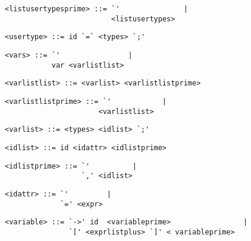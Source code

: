 \begin{footnotesize}
\begin{lstlisting}[frame=single, label={listusertypesprime}]
<listusertypesprime> ::= `'               |
                         <listusertypes>
\end{lstlisting}

\begin{lstlisting}[frame=single, label={usertypes}]
<usertype> ::= id `=` <types> `;'
\end{lstlisting}

\begin{lstlisting}[frame=single, label={vars}, language=pie]
<vars> ::= `'                |
           var <varlistlist>
\end{lstlisting}

\begin{lstlisting}[frame=single, label={varlistlist}, language=pie]
<varlistlist> ::= <varlist> <varlistlistprime>
\end{lstlisting}

\begin{lstlisting}[frame=single, label={varlistlistprime}, language=pie]
<varlistlistprime> ::= `'            |
                      <varlistlist>
\end{lstlisting}

\begin{lstlisting}[frame=single, label={varlist}, language=pie]
<varlist> ::= <types> <idlist> `;'
\end{lstlisting}

\begin{lstlisting}[frame=single, label={idlist}, language=pie]
<idlist> ::= id <idattr> <idlistprime>
\end{lstlisting}

\begin{lstlisting}[frame=single, label={idlistprime}, language=pie]
<idlistprime> ::= `'          |
                  `,' <idlist>
\end{lstlisting}

\begin{lstlisting}[frame=single, label={idattr}, language=pie]
<idattr> ::= `'         | 
             `=' <expr> 
\end{lstlisting}

\begin{lstlisting}[frame=single, label={variable}, language=pie]
<variable> ::= `->' id  <variableprime>                 | 
               `[' <exprlistplus> `]' < variableprime>
\end{lstlisting}


\end{footnotesize}
